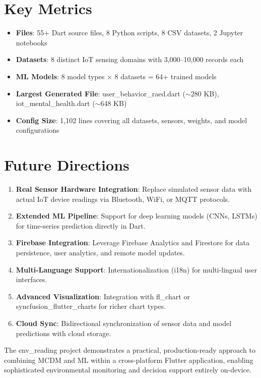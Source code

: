 \documentclass[12pt,a4paper,oneside]{report}
\begin{document}
\section{Key Metrics}

\begin{itemize}
  \item \textbf{Files}: 55+ Dart source files, 8 Python scripts, 8 CSV datasets, 2 Jupyter notebooks
  \item \textbf{Datasets}: 8 distinct IoT sensing domains with 3,000--10,000 records each
  \item \textbf{ML Models}: 8 model types $\times$ 8 datasets = 64+ trained models
  \item \textbf{Largest Generated File}: user\_behavior\_raed.dart ($\sim$280 KB), iot\_mental\_health.dart ($\sim$648 KB)
  \item \textbf{Config Size}: 1,102 lines covering all datasets, sensors, weights, and model configurations
\end{itemize}

\section{Future Directions}

\begin{enumerate}
  \item \textbf{Real Sensor Hardware Integration}: Replace simulated sensor data with actual IoT device readings via Bluetooth, WiFi, or MQTT protocols.
  \item \textbf{Extended ML Pipeline}: Support for deep learning models (CNNs, LSTMs) for time-series prediction directly in Dart.
  \item \textbf{Firebase Integration}: Leverage Firebase Analytics and Firestore for data persistence, user analytics, and remote model updates.
  \item \textbf{Multi-Language Support}: Internationalization (i18n) for multi-lingual user interfaces.
  \item \textbf{Advanced Visualization}: Integration with fl\_chart or syncfusion\_flutter\_charts for richer chart types.
  \item \textbf{Cloud Sync}: Bidirectional synchronization of sensor data and model predictions with cloud storage.
\end{enumerate}

The env\_reading project demonstrates a practical, production-ready approach to combining MCDM and ML within a cross-platform Flutter application, enabling sophisticated environmental monitoring and decision support entirely on-device.
\end{document}
